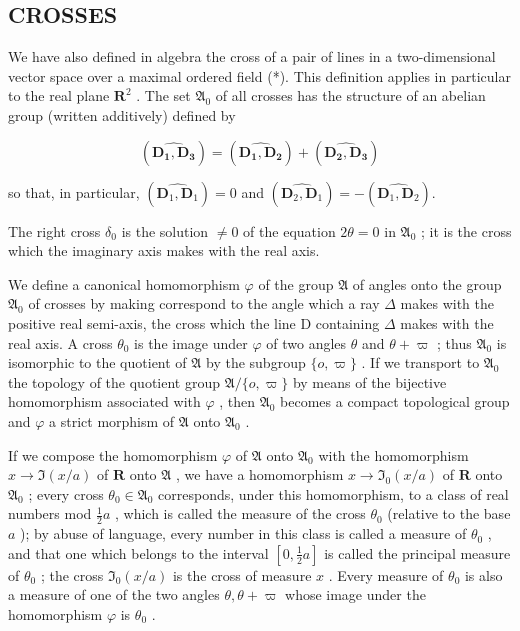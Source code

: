 \subsection{CROSSES}

We have also defined in algebra the cross of a pair of lines in a two-dimensional vector space over a maximal ordered field (*). This definition applies in particular to the real plane \(\mathbf{R}^2\) . The set \(\mathfrak{A}_0\) of all crosses has the structure of an abelian group (written additively) defined by

\[
(\widehat {\mathbf {D _ {1} , D _ {3}}}) = (\widehat {\mathbf {D _ {1} , D _ {2}}}) + (\widehat {\mathbf {D _ {2} , D _ {3}}})
\]

so that, in particular, \((\widehat{\mathbf{D}_1,\mathbf{D}_1}) = 0\) and \((\widehat{\mathbf{D}_2,\mathbf{D}_1}) = -(\widehat{\mathbf{D}_1,\mathbf{D}_2}).\)

The right cross \(\delta_0\) is the solution \(\neq 0\) of the equation \(2\theta = 0\) in \(\mathfrak{A}_0\) ; it is the cross which the imaginary axis makes with the real axis.

We define a canonical homomorphism \(\varphi\) of the group \(\mathfrak{A}\) of angles onto the group \(\mathfrak{A}_0\) of crosses by making correspond to the angle which a ray \(\Delta\) makes with the positive real semi-axis, the cross which the line D containing \(\Delta\) makes with the real axis. A cross \(\theta_0\) is the image under \(\varphi\) of two angles \(\theta\) and \(\theta + \varpi\) ; thus \(\mathfrak{A}_0\) is isomorphic to the quotient of \(\mathfrak{A}\) by the subgroup \(\{o, \varpi\}\) . If we transport to \(\mathfrak{A}_0\) the topology of the quotient group \(\mathfrak{A}/\{o, \varpi\}\) by means of the bijective homomorphism associated with \(\varphi\) , then \(\mathfrak{A}_0\) becomes a compact topological group and \(\varphi\) a strict morphism of \(\mathfrak{A}\) onto \(\mathfrak{A}_0\) .

If we compose the homomorphism \(\varphi\) of \(\mathfrak{A}\) onto \(\mathfrak{A}_0\) with the homomorphism \(x \to \Im(x/a)\) of \(\mathbf{R}\) onto \(\mathfrak{A}\) , we have a homomorphism \(x \to \Im_0(x/a)\) of \(\mathbf{R}\) onto \(\mathfrak{A}_0\) ; every cross \(\theta_0 \in \mathfrak{A}_0\) corresponds, under this homomorphism, to a class of real numbers mod \(\frac{1}{2}a\) , which is called the measure of the cross \(\theta_0\) (relative to the base \(a\) ); by abuse of language, every number in this class is called a measure of \(\theta_0\) , and that one which belongs to the interval \([0, \frac{1}{2}a]\) is called the principal measure of \(\theta_0\) ; the cross \(\Im_0(x/a)\) is the cross of measure \(x\) . Every measure of \(\theta_0\) is also a measure of one of the two angles \(\theta, \theta + \varpi\) whose image under the homomorphism \(\varphi\) is \(\theta_0\) .


